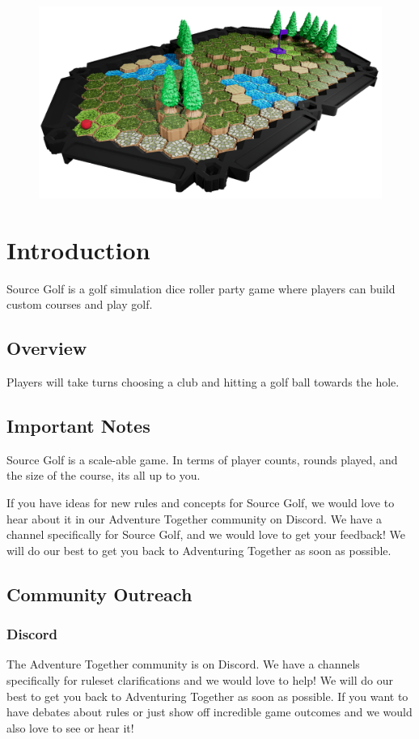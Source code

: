 \documentclass[../main.tex]{subfiles}
\begin{document}
\begin{figure}
    \centering
    \includegraphics[width=1\linewidth]{chapters//introduction/Source Golf full hole sideangle.png}
\end{figure}

\section{Introduction}
Source Golf is a golf simulation dice roller party game where players can build custom courses and play golf.  

\subsection{Overview}
Players will take turns choosing a club and hitting a golf ball towards the hole. 

\subsection{Important Notes}
Source Golf is a scale-able game. In terms of player counts, rounds played, and the size of the course, its all up to you. 

If you have ideas for new rules and concepts for Source Golf, we would love to hear about it in our Adventure Together community on Discord. We have a channel specifically for Source Golf, and we would love to get your feedback! 
We will do our best to get you back to Adventuring Together as soon as possible. 

\subsection{Community Outreach}
\subsubsection{Discord}
The Adventure Together community is on Discord. We have a channels specifically for ruleset clarifications and we would love to help!  We will do our best to get you back to Adventuring Together as soon as possible. If you want to have debates about rules or just show off incredible game outcomes and we would also love to see or hear it!
\end{document}
